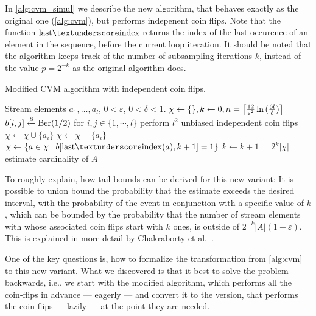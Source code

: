 In \cref{alg:cvm_simul} we describe the new algorithm, that behaves exactly as the original one (\cref{alg:cvm}), but performs indepenent coin flips.
Note that the function $\mathrm{last{\textunderscore}index}$ returns the index of the last-occurence of an element in the sequence, before the current loop iteration.
It should be noted that the algorithm keeps track of the number of subsampling iterations $k$, instead of the value $p = 2^{-k}$ as the original algorithm does.
%
\begin{algorithm}[h!]
	\caption{Modified CVM algorithm with independent coin flips.}\label{alg:cvm_simul}
	\begin{algorithmic}[1]
  \Require Stream elements $a_1,\dots,a_l$, $0 < \varepsilon$, $0 < \delta < 1$.
  \State $\chi \gets \{\}, k \gets 0, n = \ceil*{\frac{12}{\varepsilon^2} \ln{(\frac{6l}{\delta})} }$
  \State $b[i,j] \getsr \Ber(1/2)$ for $i,j \in \{1,\cdots,l\}$ \Comment perform $l^2$ unbiased independent coin flips
      \State $\chi \gets \chi \cup \{a_i\}$
    \Else
      \State $\chi \gets \chi - \{a_i\}$
    \EndIf
      \State $\chi \gets \{a \in \chi \;|\; b[\mathrm{last{\textunderscore}index}(a),k+1] = 1\}$
      \State $k \gets k+1$
    \EndIf
      \State \Return $\bot$
    \EndIf
  \EndFor
  \State \Return $2^k |\chi|$ \Comment estimate cardinality of $A$
  \end{algorithmic}
\end{algorithm}
To roughly explain, how tail bounds can be derived for this new variant:
It is possible to union bound the probability that the estimate exceeds the desired interval, with the probability of the event in conjunction with a specific value of $k$, which can be bounded by the probability that the number of stream elements with whose associated coin flips start with $k$ ones, is outside of $2^{-k} |A| (1 \pm \varepsilon)$.
This is explained in more detail by Chakraborty et al.~\cite{chakraborty2022}.

One of the key questions is, how to formalize the transformation from \cref{alg:cvm} to this new variant.
What we discovered is that it best to solve the problem backwards, i.e., we start with the modified algorithm, which performs all the coin-flips in advance --- eagerly --- and convert it to the version, that performs the coin flips --- lazily --- at the point they are needed.

